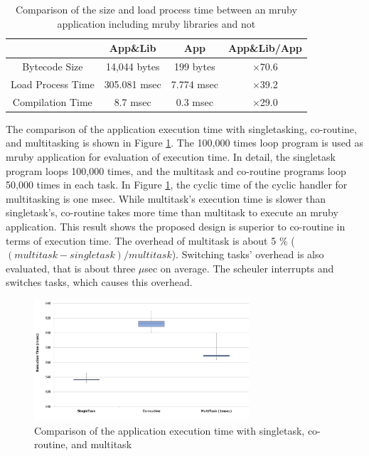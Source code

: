 \documentclass[submit]{ipsj_v2/UTF8/ipsj}
\begin{document}
\begin{table}[t]
    \centering
    \caption{Comparison of the size and load process time between an mruby application including mruby libraries and not}
    \begin{tabular}{c||c|c|c}
                            & App\&Lib     & App        &   App\&Lib/App  \\ \hline
          Bytecode Size     & 14,044 bytes & 199 bytes  &   $\times$70.6          \\ %
          Load Process Time & 305.081 msec & 7.774 msec &   $\times$39.2          \\
          Compilation Time  & 8.7 msec     & 0.3 msec   &   $\times$29.0          \\
    \end{tabular}
    \label{tab:size_and_time}
\end{table}

The comparison of the application execution time with singletasking, co-routine, and multitasking is shown in Figure \ref{fig:comparison_s_c_m}.
The 100,000 times loop program is used as mruby application for evaluation of execution time.
In detail, the singletask program loops 100,000 times, and the multitask and co-routine programs loop 50,000 times in each task.
In Figure \ref{fig:comparison_s_c_m}, the cyclic time of the cyclic handler for multitasking is one msec.
While multitask's execution time is slower than singletask's, co-routine takes more time than multitask to execute an mruby application.
This result shows the proposed design is superior to co-routine in terms of execution time.
The overhead of multitask is about 5 \% ($(multitask-singletask)/multitask$).
Switching tasks' overhead is also evaluated, that is about three $\mu$sec on average.
The scheuler interrupts and switches tasks, which causes this overhead.


\begin{figure}[t]
    \centering
    \includegraphics[width=8cm,clip]{../EMSOFT2016/figure/comparison_s_c_m.pdf}
    \caption{Comparison of the application execution time with singletask, co-routine, and multitask}
    \label{fig:comparison_s_c_m}
\end{figure}
\end{document}
